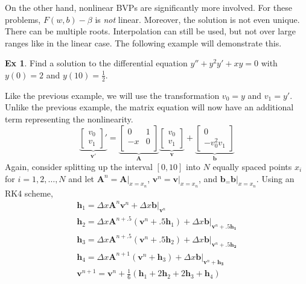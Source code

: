 \documentclass[]{article}
\theoremstyle{definition}
\newtheorem{exmp}{Ex}[section]
\numberwithin{equation}{section}
\begin{document}
On the other hand, nonlinear BVPs are significantly more involved. For these problems, $F(w,b) - \beta$ is \textit{not} linear. Moreover, the solution is not even unique. There can be multiple roots. Interpolation can still be used, but not over large ranges like in the linear case. The following example will demonstrate this.

\begin{exmp}
	Find a solution to the differential equation $y'' + y^2y' + xy = 0$ with $y(0) = 2$ and $y(10) = \frac{1}{2}$.
\end{exmp}
Like the previous example, we will use the transformation $v_0 = y$ and $v_1 = y'$. Unlike the previous example, the matrix equation will now have an additional term representing the nonlinearity.
\[\underbrace{
	\begin{bmatrix}
	v_0 \\
	v_1
	\end{bmatrix}'}_{\mathbf{v}'} = \underbrace{\begin{bmatrix}
	0 & 1 \\
	-x & 0 \\
	\end{bmatrix}}_{\mathbf{A}} \underbrace{\begin{bmatrix}
	v_0 \\
	v_1
	\end{bmatrix}}_{\mathbf{v}} + 
\underbrace{\begin{bmatrix}
	0 \\
	-v_0^2v_1
	\end{bmatrix}}_{\mathbf{b}}
\] 
Again, consider splitting up the interval $[0,10]$ into $N$ equally spaced points $x_i$ for $i=1,2,\dots,N$ and let $\mathbf{A}^n = \mathbf{A}|_{x=x_n}$, $\mathbf{v}^n=\mathbf{v}|_{x=x_n}$, and $\mathbf{b}_ = \mathbf{b}|_{x = x_n}$. Using an RK4 scheme,
\begin{gather*}
\mathbf{h}_1 = \Delta x \mathbf{A}^{n} \mathbf{v}^n + \Delta x\mathbf{b}|_{\mathbf{v}^n}\\
\mathbf{h}_2 = \Delta x \mathbf{A}^{n+.5} (\mathbf{v}^n+.5\mathbf{h}_1) + \Delta x\mathbf{b}|_{\mathbf{v}^n + .5\mathbf{h_1}}\\
\mathbf{h}_3 = \Delta x \mathbf{A}^{n+.5} (\mathbf{v}^n+.5\mathbf{h}_2) +  \Delta x\mathbf{b}|_{\mathbf{v}^n + .5\mathbf{h_2}}\\
\mathbf{h}_4 = \Delta x \mathbf{A}^{n+1} (\mathbf{v}^n+\mathbf{h}_3) + \Delta x\mathbf{b}|_{\mathbf{v}^n + \mathbf{h_3}}\\
\mathbf{v}^{n+1} = \mathbf{v}^n + \frac{1}{6} (\mathbf{h}_1 + 2\mathbf{h}_2 + 2 \mathbf{h}_3 + \mathbf{h}_4) 
\end{gather*}
\end{document}
